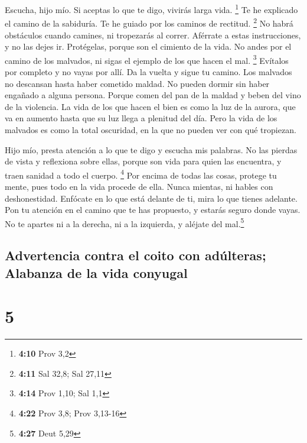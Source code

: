  Escucha, hijo mío. Si aceptas lo que te digo, vivirás
larga vida. \footnote{\textbf{4:10} Prov 3,2}  Te he
explicado el camino de la sabiduría. Te he guiado por los caminos de
rectitud. \footnote{\textbf{4:11} Sal 32,8; Sal 27,11} 
No habrá obstáculos cuando camines, ni tropezarás al correr.
 Aférrate a estas instrucciones, y no las dejes ir.
Protégelas, porque son el cimiento de la vida.  No andes
por el camino de los malvados, ni sigas el ejemplo de los que hacen el
mal. \footnote{\textbf{4:14} Prov 1,10; Sal 1,1} 
Evítalos por completo y no vayas por allí. Da la vuelta y sigue tu
camino.  Los malvados no descansan hasta haber cometido
maldad. No pueden dormir sin haber engañado a alguna persona.
 Porque comen del pan de la maldad y beben del vino de la
violencia.  La vida de los que hacen el bien es como la
luz de la aurora, que va en aumento hasta que su luz llega a plenitud
del día.  Pero la vida de los malvados es como la total
oscuridad, en la que no pueden ver con qué tropiezan.

 Hijo mío, presta atención a lo que te digo y escucha mis
palabras.  No las pierdas de vista y reflexiona sobre
ellas,  porque son vida para quien las encuentra, y traen
sanidad a todo el cuerpo. \footnote{\textbf{4:22} Prov 3,8; Prov 3,13-16}
 Por encima de todas las cosas, protege tu mente, pues
todo en la vida procede de ella.  Nunca mientas, ni
hables con deshonestidad.  Enfócate en lo que está
delante de ti, mira lo que tienes adelante.  Pon tu
atención en el camino que te has propuesto, y estarás seguro donde
vayas.  No te apartes ni a la derecha, ni a la izquierda,
y aléjate del mal.\footnote{\textbf{4:27} Deut 5,29}

\hypertarget{advertencia-contra-el-coito-con-aduxfalteras-alabanza-de-la-vida-conyugal}{%
\subsection{Advertencia contra el coito con adúlteras; Alabanza de la
vida
conyugal}\label{advertencia-contra-el-coito-con-aduxfalteras-alabanza-de-la-vida-conyugal}}

\hypertarget{section-4}{%
\section{5}\label{section-4}}


